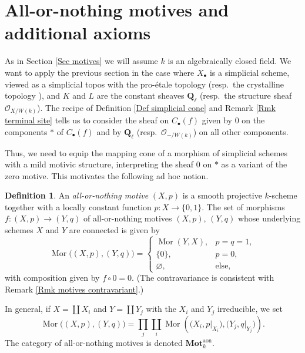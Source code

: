 \documentclass[11pt]{amsart}
\theoremstyle{definition}
\newtheorem{Def}[Thm]{Definition}
\newcommand{\Q}{\mathbf Q}
\newcommand{\Mor}{\operatorname{Mor}}
\newcommand{\M}{\mathbf{Mot}}
\newcommand{\aon}{^{\text{aon}}}
\begin{document}
\section{All-or-nothing motives and additional axioms}\label{Sec all-or-nothing}

As in Section \ref{Sec motives} we will assume $k$ is an
algebraically closed field. We want to apply the previous section in
the case where $X_\bullet$ is a simplicial scheme, viewed as a
simplicial topos with the pro-\'etale topology \cite{BS} (resp.~the
crystalline topology \cite{BerCris}), and $K$ and $L$ are the
constant sheaves $\Q_\ell$ (resp.~the structure sheaf $\mathcal
O_{X/W(k)}$). The recipe of Definition \ref{Def simplicial cone} and
Remark \ref{Rmk terminal site} tells us to consider the sheaf on
$C_\bullet(f)$ given by $0$ on the components $*$ of $C_\bullet(f)$
and by $\Q_\ell$ (resp.~$\mathcal O_{-/W(k)}$) on all other
components.

Thus, we need to equip the mapping cone of a morphism of simplicial
schemes with a mild motivic structure, interpreting the sheaf $0$ on
$*$ as a variant of the zero motive. This motivates the following ad
hoc notion.

\begin{Def}
An \emph{all-or-nothing motive} $(X,p)$ is a smooth projective
$k$-scheme together with a locally constant function $p \colon X \to
\{0,1\}$. The set of morphisms $f \colon (X,p) \to (Y,q)$ of
all-or-nothing motives $(X,p)$, $(Y,q)$ whose underlying schemes $X$
and $Y$ are connected is given by
\[
\Mor\big((X,p),(Y,q)\big) = \left\{\begin{array}{ll}\Mor(Y,X), &
p=q=1, \\ \{0\}, & p=0, \\ \varnothing, & \text{else,} \end{array}
\right.
\]
with composition given by $f \circ 0 = 0$. (The contravariance is
consistent with Remark \ref{Rmk motives contravariant}.)

In general, if $X = \coprod X_i$ and $Y = \coprod Y_j$ with the
$X_i$ and $Y_j$ irreducible, we set
\[
\Mor\big((X,p),(Y,q)\big) = \prod_j \coprod_i
\Mor\left(\big(X_i,p\big|_{X_i}\big),\big(Y_j,
q\big|_{Y_j}\big)\right).
\]
The category of all-or-nothing motives is denoted $\M_k\aon$.
\end{Def}
\end{document}

